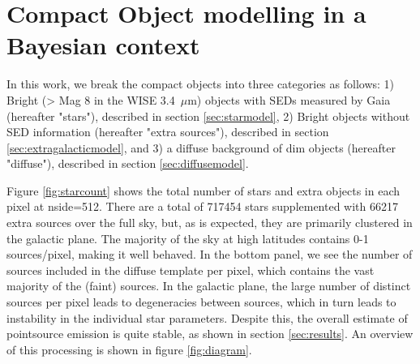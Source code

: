 \documentclass{aa}
\begin{document}
\section{Compact Object modelling in a Bayesian context}
\label{sec:models}

In this work, we break the compact objects into three categories as follows: 1) Bright (> Mag 8 in the WISE 3.4 $\,\mu$m) objects with SEDs measured by Gaia (hereafter "stars"), described in section \ref{sec:starmodel}, 2) Bright objects without SED information (hereafter "extra sources"), described in section \ref{sec:extragalacticmodel}, and 3) a diffuse background of dim objects (hereafter "diffuse"), described in section \ref{sec:diffusemodel}.

Figure \ref{fig:starcount} shows the total number of stars and extra objects in each pixel at nside=512. There are a total of 717454 stars supplemented with 66217 extra sources over the full sky, but, as is expected, they are primarily clustered in the galactic plane. The majority of the sky at high latitudes contains 0-1 sources/pixel, making it well behaved. In the bottom panel, we see the number of sources included in the diffuse template per pixel, which contains the vast majority of the (faint) sources. In the galactic plane, the large number of distinct sources per pixel leads to degeneracies between sources, which in turn leads to instability in the individual star parameters. Despite this, the overall estimate of pointsource emission is quite stable, as shown in section \ref{sec:results}. An overview of this processing is shown in figure \ref{fig:diagram}.
\end{document}
